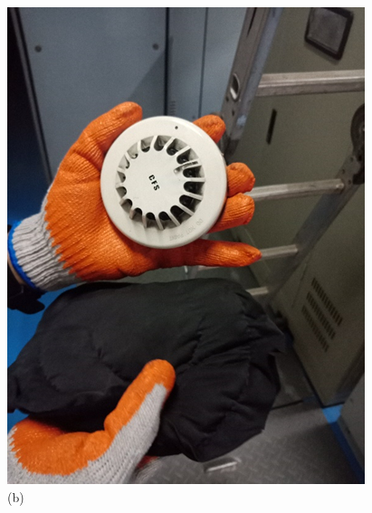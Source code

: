 \begin{figure}[h]
\begin{minipage}[b]{0.22\linewidth}
		\includegraphics[width=\textwidth]{figures/ch02_fdas02}
		\caption*{(b)}
	\end{minipage}
	\hspace{0.05cm}
	\begin{minipage}[b]{0.22\linewidth}
		\centering

\end{minipage}
\end{figure}

